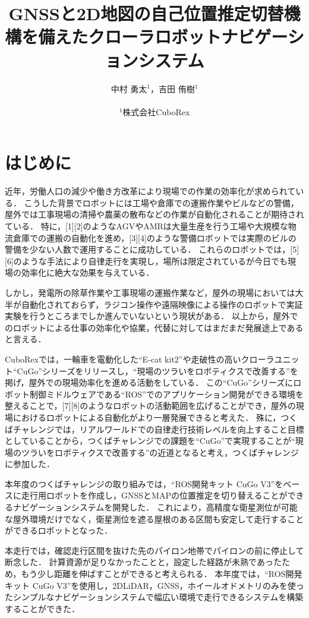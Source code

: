 \documentclass[platex,dvipdfmx]{rbproceedings}
\title{GNSSと2D地図の自己位置推定切替機構を備えたクローラロボットナビゲーションシステム}
\author{%
中村 勇太${}^{1}$，吉田 侑樹${}^{1}$\\ \\
${}^{1}$株式会社CuboRex
}
\begin{document}
\maketitle


\section{はじめに}
近年，労働人口の減少や働き方改革により現場での作業の効率化が求められている．
こうした背景でロボットには工場や倉庫での運搬作業やビルなどの警備，屋外では工事現場の清掃や農薬の散布などの作業が自動化されることが期待されている．
特に，[1][2]のようなAGVやAMRは大量生産を行う工場や大規模な物流倉庫での運搬の自動化を進め，[3][4]のような警備ロボットでは実際のビルの警備を少ない人数で運用することに成功している．
これらのロボットでは，[5][6]のような手法により自律走行を実現し，場所は限定されているが今日でも現場の効率化に絶大な効果を与えている．

しかし，発電所の除草作業や工事現場の運搬作業など，屋外の現場においては大半が自動化されておらず，ラジコン操作や遠隔映像による操作のロボットで実証実験を行うところまでしか進んでいないという現状がある．
以上から，屋外でのロボットによる仕事の効率化や協業，代替に対してはまだまだ発展途上であると言える．

CuboRexでは，一輪車を電動化した“E-cat kit2”や走破性の高いクローラユニット“CuGo”シリーズをリリースし，“現場のツラいをロボティクスで改善する”を掲げ，屋外での現場効率化を進める活動をしている．
この“CuGo”シリーズにロボット制御ミドルウェアである“ROS”でのアプリケーション開発ができる環境を整えることで，[7][8]のようなロボットの活動範囲を広げることができ，屋外の現場におけるロボットによる自動化がより一層発展できると考えた．
殊に，つくばチャレンジでは，リアルワールドでの自律走行技術レベルを向上すること目標としていることから，つくばチャレンジでの課題を“CuGo”で実現することが“現場のツラいをロボティクスで改善する”の近道となると考え，つくばチャレンジに参加した．

本年度のつくばチャレンジの取り組みでは，“ROS開発キット CuGo V3”をベースに走行用ロボットを作成し，GNSSとMAPの位置推定を切り替えることができるナビゲーションシステムを開発した．
これにより，高精度な衛星測位が可能な屋外環境だけでなく，衛星測位を遮る屋根のある区間も安定して走行することができるロボットとなった．

本走行では，確認走行区間を抜けた先のパイロン地帯でパイロンの前に停止して断念した．
計算資源が足りなかったことと，設定した経路が未熟であったため，もう少し距離を伸ばすことができると考えられる．
本年度では，“ROS開発キット CuGo V3”を使用し，2DLiDAR，GNSS，ホイールオドメトリのみを使ったシンプルなナビゲーションシステムで幅広い環境で走行できるシステムを構築することができた．
\end{document}
